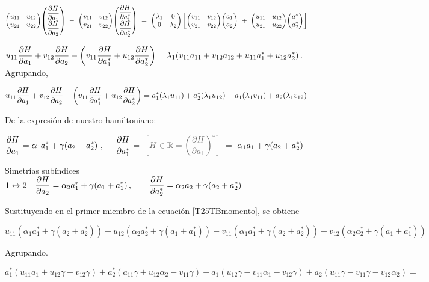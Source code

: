 $\mqty(u_{11}&u_{12}\\u_{21}&u_{22}) \mqty(\displaystyle \pdv{H}{a_1} \\ \displaystyle \pdv{H}{a_2})   \ - \  \mqty(v_{11}&v_{12}\\v_{21}&v_{22}) \mqty(\displaystyle \pdv{H}{a_1^*} \\ \displaystyle \pdv{H}{a_2^*}) \ = \ \mqty(\lambda_1 &0\\0&\lambda_2) \left[ \mqty(v_{11}&v_{12}\\v_{21}&v_{22}) \mqty(a_1\\a_2) \ + \ \mqty(u_{11}&u_{12}\\u_{21}&u_{22}) \mqty(a_1^*\\a_2^*) \right]$

$\displaystyle u_{11}\pdv{H}{a_1}+v_{12}\pdv{H}{a_2}-\left( v_{11}\pdv{H}{a_1^*}+u_{12}\pdv{H}{a_2^*} \right)=\lambda_1(v_{11}a_{11}+v_{12}a_{12}+u_{11}a_1^*+u_{12}a_2^*)\, . \ $ Agrupando,


\begin{equation}
\label{T25TBmomento}	
\displaystyle u_{11}\pdv{H}{a_1}+v_{12}\pdv{H}{a_2}-\left( v_{11}\pdv{H}{a_1^*}+u_{12}\pdv{H}{a_2^*} \right)=
a_1^*(\lambda_1 u_{11}) +a_2^*(\lambda_1 u_{12})+a_1(\lambda_1v_{11})+a_2(\lambda_1v_{12})
\end{equation}

De la expresión de nuestro hamiltoniano: 

$\displaystyle  \pdv{H}{a_1}= \alpha_1 a_1^*+\gamma(a_2+a_2^*) \ , \quad \ \pdv{H}{a_1^*}= \ \textcolor{gris}{ \left[ H\in \mathbb R  = \left( \pdv{H}{a_1} \right)^* \right] } \ = \  \alpha_1 a_1+\gamma(a_2+a_2^*)$

Simetrías subíndices $1\leftrightarrow 2\quad \displaystyle  \pdv{H}{a_2}= \alpha_2 a_1^*+\gamma(a_1+a_1^*)\, , \qquad  \pdv{H}{a_2^*}=\alpha_2 a_2+\gamma(a_2+a_2^*)$

Sustituyendo en el primer miembro de la ecuación \ref{T25TBmomento}, se obtiene

$u_11 \left( \alpha_1 a_1^*+\gamma(a_2+a_2^*) \right) + 
u_12 \left( \alpha_2 a_2^*+\gamma(a_1+a_1^*) \right) -
v_11 \left( \alpha_1 a_1^*+\gamma(a_2+a_2^*) \right) -
v_12 \left( \alpha_2 a_2^*+\gamma(a_1+a_1^*) \right) $

Agrupando.

$a_1^*(u_{11}a_1+u_{12}\gamma-v_{12}\gamma)+a_2^*(a_{11}\gamma+u_{12}\alpha_2-v_{11}\gamma)+ a_1(u_{12}\gamma-v_{11}\alpha_1-v_{12}\gamma)+a_2(u_{11}\gamma-v_{11}\gamma-v_{12}\alpha_2 )=  $

